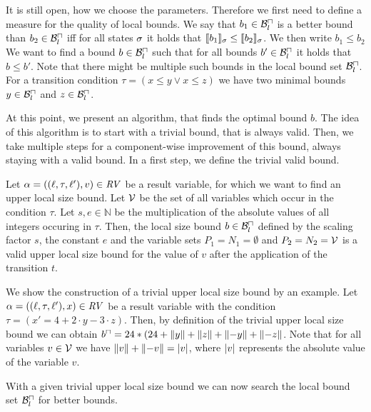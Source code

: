 It is still open, how we choose the parameters.
Therefore we first need to define a measure for the quality of local bounds.
We say that $b_1 \in \mathcal{B}^\sqcap_l$ is a better bound than $b_2 \in \mathcal{B}^\sqcap_l$ iff for all states $\sigma$ it holds that $\llbracket b_1 \rrbracket_{\sigma} \leq \llbracket b_2 \rrbracket_{\sigma}$.
We then write $b_1 \leq b_2$
We want to find a bound $b \in \mathcal{B}^\sqcap_l$ such that for all bounds $b' \in \mathcal{B}^\sqcap_l$ it holds that $b \leq b'$.
Note that there might be multiple such bounds in the local bound set $\mathcal{B}^\sqcap_l$.
For a transition condition $\tau = (x \leq y \vee x \leq z)$ we have two minimal bounds $y \in \mathcal{B}^\sqcap_l$ and $z \in \mathcal{B}^\sqcap_l$.

At this point, we present an algorithm, that finds the optimal bound $b$.
The idea of this algorithm is to start with a trivial bound, that is always valid.
Then, we take multiple steps for a component-wise improvement of this bound, always staying with a valid bound.
In a first step, we define the trivial valid bound.

\begin{definition}
  Let $\alpha = ((\ell,\tau,\ell'),v) \in \mathit{RV}$ be a result variable, for which we want to find an upper local size bound.
  Let $\mathcal{V}$ be the set of all variables which occur in the condition $\tau$.
  Let $s, e \in \mathbb{N}$ be the multiplication of the absolute values of all integers occuring in $\tau$.
  Then, the local size bound $b \in \mathcal{B}^\sqcap_l$ defined by the scaling factor $s$, the constant $e$ and the variable sets $P_1 = N_1 = \emptyset$ and $P_2 = N_2 = \mathcal{V}$ is a valid upper local size bound for the value of $v$ after the application of the transition $t$.
\end{definition}


We show the construction of a trivial upper local size bound by an example.
Let $\alpha = ((\ell,\tau,\ell'),x) \in \mathit{RV}$ be a result variable with the condition $\tau = (x' = 4 + 2 \cdot y - 3 \cdot z)$.
Then, by definition of the trivial upper local size bound we can obtain $b^\sqcap = 24 * (24 + \left\Vert y\right\Vert + \left\Vert z\right\Vert + \left\Vert-y\right\Vert + \left\Vert-z\right\Vert$.
Note that for all variables $v \in \mathcal{V}$ we have $\left\Vert v\right\Vert + \left\Vert-v\right\Vert = \left|v\right|$, where $\left|v\right|$ represents the absolute value of the variable $v$.

With a given trivial upper local size bound we can now search the local bound set $\mathcal{B}^\sqcap_l$ for better bounds.

